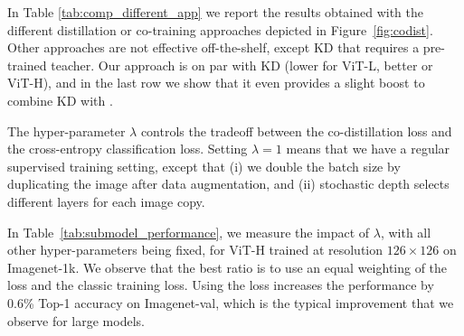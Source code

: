 In Table \ref{tab:comp_different_app}  we report the results obtained with the different distillation or co-training approaches depicted in Figure~\ref{fig:codist}. Other approaches are not effective off-the-shelf, except KD that requires a pre-trained teacher. 
Our approach is on par with KD (lower for ViT-L, better or ViT-H), and in the last row we show that it even provides a slight boost to combine KD with \ours. 


The hyper-parameter $\lambda$ controls the tradeoff between the co-distillation loss and the cross-entropy classification loss. 
Setting $\lambda=1$ means that we have a regular supervised training setting, except that (i) we double the batch size by duplicating the image after data augmentation, and (ii)  stochastic depth selects different layers for each image copy. 

In Table~\ref{tab:submodel_performance}, we  measure the  impact of   $\lambda$, with all other hyper-parameters being fixed,
 for ViT-H trained at resolution $126\!\times\!126$ on Imagenet-1k.
We observe that the best ratio is to use an equal weighting of the \ours loss and the classic training loss. 
Using the \ours loss increases the performance  by 0.6\% Top-1 accuracy on Imagenet-val, which is the typical improvement that we observe for large models. 


\begin{table}
    \centering
        \vspace{-0.7em}
    \caption{Ablation of the parameter $\lambda$
controlling the weight of the co-distillation loss across submodels  (Imagenet1k-val, top1-acc).  Model ViT-H trained at resolution $126\!\times\!126$ on Imagenet-1k during 800 epochs. $\lambda=1.0$ corresponds a supervised baseline and $\lambda=0.5$ corresponds to \ours.
\label{tab:submodel_performance}}
\end{table}



